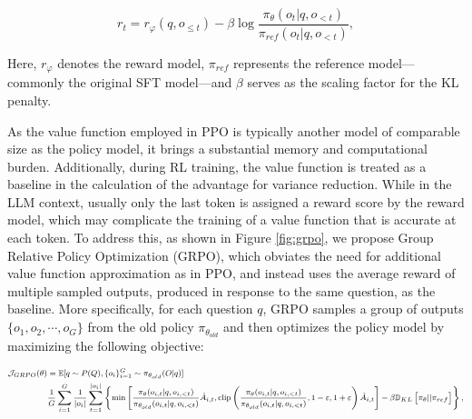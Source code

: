 \begin{itemize}[topsep=0pt]
\begin{itemize}[topsep=0pt]
\begin{equation}
    r_{t} = r_\varphi(q, o_{\le t}) - \beta \log\frac{\pi_{\theta}(o_{t}|q, o_{<t})}{\pi_{ref}(o_{t}|q, o_{<t})},
\label{eq:PPO-reward}
\end{equation}

Here, $r_\varphi$ denotes the reward model, $\pi_{ref}$ represents the reference model—commonly the original SFT model—and $\beta$ serves as the scaling factor for the KL penalty.

As the value function employed in PPO is typically another model of comparable size as the policy model, it brings a substantial memory and computational burden. Additionally, during RL training, the value function is treated as a baseline in the calculation of the advantage for variance reduction. While in the LLM context, usually only the last token is assigned a reward score by the reward model, which may complicate the training of a value function that is accurate at each token. To address this, as shown in Figure \ref{fig:grpo}, we propose Group Relative Policy Optimization (GRPO), which obviates the need for additional value function approximation as in PPO, and instead uses the average reward of multiple sampled outputs, produced in response to the same question, as the baseline. More specifically, for each question $q$, GRPO samples a group of outputs $\{o_1, o_2, \cdots, o_G\}$  from the old policy  $\pi_{\theta_{old}}$  and then optimizes the policy model by maximizing the following objective:

\begin{equation}
\footnotesize
\begin{split}
    \mathcal{J}_{GRPO}(\theta) &= \mathbb{E}{[q \sim P(Q), \{o_i\}_{i=1}^G \sim \pi_{\theta_{old}}(O|q)]}  \\
    & \frac{1}{G} \sum_{i=1}^G \frac{1}{|o_i|} \sum_{t=1}^{|o_i|} \left\{ \min \left[ \frac{\pi_\theta(o_{i,t} | q, o_{i,<t})}{\pi_{\theta_{old}}(o_{i,t} | q, o_{i,<t})} \hat{A}_{i,t}, \text{clip} \left( \frac{\pi_\theta(o_{i,t} | q, o_{i,<t})}{\pi_{\theta_{old}}(o_{i,t} | q, o_{i,<t})}, 1 - \varepsilon, 1 + \varepsilon \right)  \hat{A}_{i,t} \right] - \beta \mathbb{D}_{KL}\left[\pi_{\theta} || \pi_{ref}\right]\right\} ,
\end{split}
\label{eq:GRPO-obj}
\end{equation}


\end{itemize}
\end{itemize}

